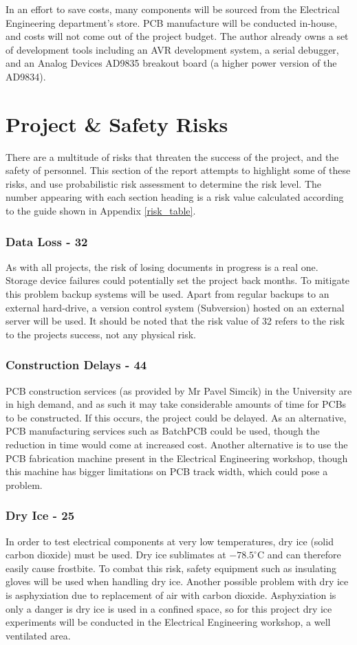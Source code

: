 \documentclass[a4paper,12pt]{article}
\begin{document}
In an effort to save costs, many components will be sourced from the Electrical Engineering department's store. PCB manufacture will be conducted in-house, and costs will not come out of the project budget. The author already owns a set of development tools including an AVR development system, a serial debugger, and an Analog Devices AD9835 breakout board (a higher power version of the AD9834).

\newpage
\section{Project \& Safety Risks}
There are a multitude of risks that threaten the success of the project, and the safety of personnel. This section of the report attempts to highlight some of these risks, and use probabilistic risk assessment to determine the risk level. The number appearing with each section heading is a risk value calculated according to the guide shown in Appendix \ref{risk_table}.

\subsubsection*{Data Loss - 32}
As with all projects, the risk of losing documents in progress is a real one. Storage device failures could potentially set the project back months. To mitigate this problem backup systems will be used. Apart from regular backups to an external hard-drive, a version control system (Subversion) hosted on an external server will be used. It should be noted that the risk value of 32 refers to the risk to the projects success, not any physical risk.

\subsubsection*{Construction Delays - 44}
PCB construction services (as provided by Mr Pavel Simcik) in the University are in high demand, and as such it may take considerable amounts of time for PCBs to be constructed. If this occurs, the project could be delayed. As an alternative, PCB manufacturing services such as BatchPCB could be used, though the reduction in time would come at increased cost. Another alternative is to use the PCB fabrication machine present in the Electrical Engineering workshop, though this machine has bigger limitations on PCB track width, which could pose a problem.

\subsubsection*{Dry Ice - 25}
In order to test electrical components at very low temperatures, dry ice (solid carbon dioxide) must be used. Dry ice sublimates at $-78.5^\circ$C and can therefore easily cause frostbite. To combat this risk, safety equipment such as insulating gloves will be used when handling dry ice. Another possible problem with dry ice is asphyxiation due to replacement of air with carbon dioxide. Asphyxiation is only a danger is dry ice is used in a confined space, so for this project dry ice experiments will be conducted in the Electrical Engineering workshop, a well ventilated area.
\end{document}
